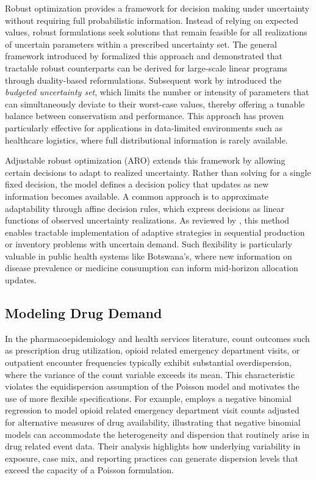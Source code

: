 \documentclass{article}
\begin{document}
Robust optimization provides a framework for decision making under uncertainty without requiring full probabilistic information. Instead of relying on expected values, robust formulations seek solutions that remain feasible for all realizations of uncertain parameters within a prescribed uncertainty set. The general framework introduced by \cite{bental} formalized this approach and demonstrated that tractable robust counterparts can be derived for large-scale linear programs through duality-based reformulations. Subsequent work by \cite{bertsim04} introduced the \textit{budgeted uncertainty set}, which limits the number or intensity of parameters that can simultaneously deviate to their worst-case values, thereby offering a tunable balance between conservatism and performance. This approach has proven particularly effective for applications in data-limited environments such as healthcare logistics, where full distributional information is rarely available.

Adjustable robust optimization (ARO) extends this framework by allowing certain decisions to adapt to realized uncertainty. Rather than solving for a single fixed decision, the model defines a decision policy that updates as new information becomes available. A common approach is to approximate adaptability through affine decision rules, which express decisions as linear functions of observed uncertainty realizations. As reviewed by \cite{yanikoglu2018aro}, this method enables tractable implementation of adaptive strategies in sequential production or inventory problems with uncertain demand. Such flexibility is particularly valuable in public health systems like Botswana’s, where new information on disease prevalence or medicine consumption can inform mid-horizon allocation updates.

\subsection{Modeling Drug Demand}
\label{2.3}

In the pharmacoepidemiology and health services literature, count outcomes such as prescription drug utilization, opioid related emergency department visits, or outpatient encounter frequencies typically exhibit substantial overdispersion, where the variance of the count variable exceeds its mean. This characteristic violates the equidispersion assumption of the Poisson model and motivates the use of more flexible specifications. For example, \cite{sec2017} employs a negative binomial regression to model opioid related emergency department visit counts adjusted for alternative measures of drug availability, illustrating that negative binomial models can accommodate the heterogeneity and dispersion that routinely arise in drug related event data. Their analysis highlights how underlying variability in exposure, case mix, and reporting practices can generate dispersion levels that exceed the capacity of a Poisson formulation.
\end{document}
